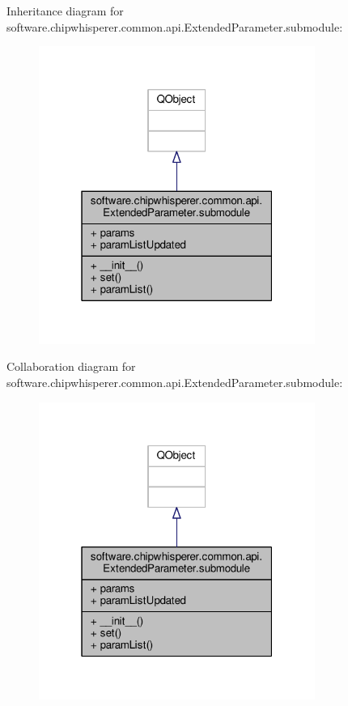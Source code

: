 Inheritance diagram for software.\+chipwhisperer.\+common.\+api.\+Extended\+Parameter.\+submodule\+:\nopagebreak
\begin{figure}[H]
\begin{center}
\leavevmode
\includegraphics[width=256pt]{d7/db5/classsoftware_1_1chipwhisperer_1_1common_1_1api_1_1ExtendedParameter_1_1submodule__inherit__graph}
\end{center}
\end{figure}


Collaboration diagram for software.\+chipwhisperer.\+common.\+api.\+Extended\+Parameter.\+submodule\+:\nopagebreak
\begin{figure}[H]
\begin{center}
\leavevmode
\includegraphics[width=256pt]{db/db7/classsoftware_1_1chipwhisperer_1_1common_1_1api_1_1ExtendedParameter_1_1submodule__coll__graph}
\end{center}
\end{figure}


